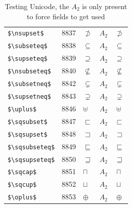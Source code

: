 ﻿\documentclass{article}
\begin{document}
\begin{table}
\begin{center}
\begin{tabular}{llll}
 \verb#$\nsupset$#     & 8837    & $\nsupset$     & $A_2\quad \nsupset$\\
 \verb#$\subseteq$#    & 8838    & $\subseteq$    & $A_2\quad \subseteq$\\
 \verb#$\supseteq$#    & 8839    & $\supseteq$    & $A_2\quad \supseteq$\\
 \verb#$\nsubseteq$#   & 8840    & $\nsubseteq$   & $A_2\quad \nsubseteq$\\
 \verb#$\subsetneq$#   & 8842    & $\subsetneq$   & $A_2\quad \subsetneq$\\
 \verb#$\supsetneq$#   & 8843    & $\supsetneq$   & $A_2\quad \supsetneq$\\
 \verb#$\uplus$#       & 8846    & $\uplus$       & $A_2\quad \uplus$\\
 \verb#$\sqsubset$#    & 8847    & $\sqsubset$    & $A_2\quad \sqsubset$\\
 \verb#$\sqsupset$#    & 8848    & $\sqsupset$    & $A_2\quad \sqsupset$\\
 \verb#$\sqsubseteq$#  & 8849    & $\sqsubseteq$  & $A_2\quad \sqsubseteq$\\
 \verb#$\sqsupseteq$#  & 8850    & $\sqsupseteq$  & $A_2\quad \sqsupseteq$\\
 \verb#$\sqcap$#       & 8851    & $\sqcap$       & $A_2\quad \sqcap$\\
 \verb#$\sqcup$#       & 8852    & $\sqcup$       & $A_2\quad \sqcup$\\
 \verb#$\oplus$#       & 8853    & $\oplus$       & $A_2\quad \oplus$\\
\end{tabular}
\end{center}
\caption{Testing Unicode, the $A_2$ is only present to force fields to get used}
\end{table}
\clearpage
\end{document}
